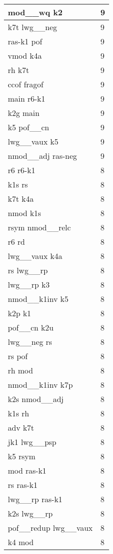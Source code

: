 \documentclass[a4 paper]{article}
\begin{document}
\begin{longtable}{p{}p{}}
mod\_\_wq k2  & 9 \\ \midrule
k7t lwg\_\_neg  & 9 \\ \midrule
ras-k1 pof  & 9 \\ \midrule
vmod k4a  & 9 \\ \midrule
rh k7t  & 9 \\ \midrule
ccof fragof  & 9 \\ \midrule
main r6-k1  & 9 \\ \midrule
k2g main  & 9 \\ \midrule
k5 pof\_\_cn  & 9 \\ \midrule
lwg\_\_vaux k5  & 9 \\ \midrule
nmod\_\_adj ras-neg  & 9 \\ \midrule
r6 r6-k1  & 8 \\ \midrule
k1s rs  & 8 \\ \midrule
k7t k4a  & 8 \\ \midrule
nmod k1s  & 8 \\ \midrule
rsym nmod\_\_relc  & 8 \\ \midrule
r6 rd  & 8 \\ \midrule
lwg\_\_vaux k4a  & 8 \\ \midrule
rs lwg\_\_rp  & 8 \\ \midrule
lwg\_\_rp k3  & 8 \\ \midrule
nmod\_\_k1inv k5  & 8 \\ \midrule
k2p k1  & 8 \\ \midrule
pof\_\_cn k2u  & 8 \\ \midrule
lwg\_\_neg rs  & 8 \\ \midrule
rs pof  & 8 \\ \midrule
rh mod  & 8 \\ \midrule
nmod\_\_k1inv k7p  & 8 \\ \midrule
k2s nmod\_\_adj  & 8 \\ \midrule
k1s rh  & 8 \\ \midrule
adv k7t  & 8 \\ \midrule
jk1 lwg\_\_psp  & 8 \\ \midrule
k5 rsym  & 8 \\ \midrule
mod ras-k1  & 8 \\ \midrule
rs ras-k1  & 8 \\ \midrule
lwg\_\_rp ras-k1  & 8 \\ \midrule
k2s lwg\_\_rp  & 8 \\ \midrule
pof\_\_redup lwg\_\_vaux  & 8 \\ \midrule
k4 mod  & 8 \\ \midrule

\end{longtable}
\end{document}

